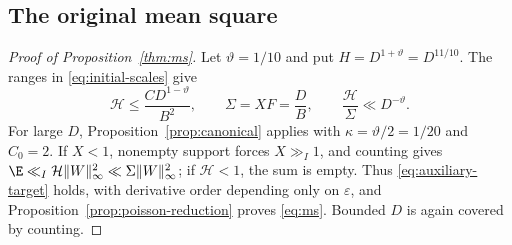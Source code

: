 \subsection{The original mean square}
\label{sec:completion}
\begin{proof}[Proof of Proposition~\ref{thm:ms}]
Let $\vartheta=1/10$ and put $H=D^{1+\vartheta}=D^{11/10}$.
The ranges in \eqref{eq:initial-scales} give
\begin{equation}\label{eq:initial-positive-gap}
 \mathcal H\le\frac{CD^{1-\vartheta}}{B^2},\qquad
 \Sigma=XF=\frac DB,\qquad
 \frac{\mathcal H}{\Sigma}\ll D^{-\vartheta}.
\end{equation}
For large $D$, Proposition~\ref{prop:canonical} applies with
$\kappa=\vartheta/2=1/20$ and $C_0=2$. If $X<1$, nonempty support forces
$X\gg_I1$, and counting gives $\E\ll_I\mathcal H\|W\|_\infty^2
\ll\Sigma\|W\|_\infty^2$; if $\mathcal H<1$, the sum is empty.
Thus \eqref{eq:auxiliary-target} holds, with derivative order depending
only on $\varepsilon$, and
Proposition~\ref{prop:poisson-reduction} proves \eqref{eq:ms}.
Bounded $D$ is again covered by counting.
\end{proof}


